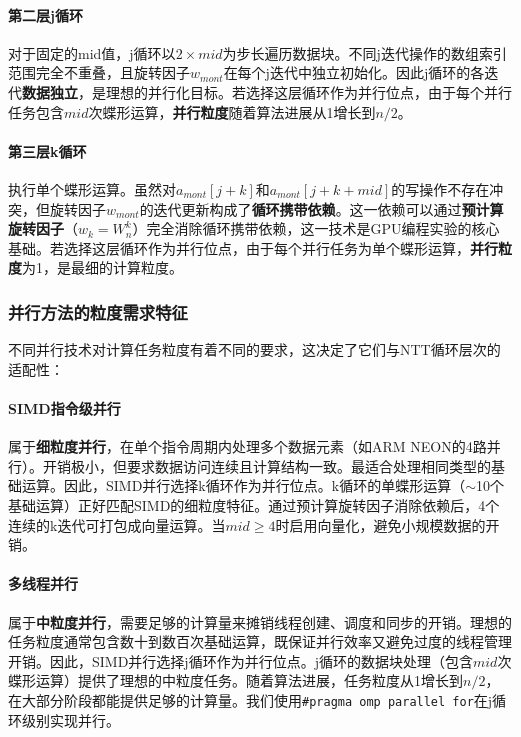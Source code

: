 \documentclass[a4paper]{article}
\begin{document}
\paragraph{第二层j循环} 对于固定的mid值，j循环以$2 \times mid$为步长遍历数据块。不同j迭代操作的数组索引范围完全不重叠，且旋转因子$w_{mont}$在每个j迭代中独立初始化。因此j循环的各迭代\textbf{数据独立}，是理想的并行化目标。若选择这层循环作为并行位点，由于每个并行任务包含$mid$次蝶形运算，\textbf{并行粒度}随着算法进展从1增长到$n/2$。

\paragraph{第三层k循环} 执行单个蝶形运算。虽然对$a_{mont}[j+k]$和$a_{mont}[j+k+mid]$的写操作不存在冲突，但旋转因子$w_{mont}$的迭代更新构成了\textbf{循环携带依赖}。这一依赖可以通过\textbf{预计算旋转因子}（$w_k = W_n^k$）完全消除循环携带依赖，这一技术是GPU编程实验的核心基础。若选择这层循环作为并行位点，由于每个并行任务为单个蝶形运算，\textbf{并行粒度}为1，是最细的计算粒度。

\subsubsection{并行方法的粒度需求特征}

不同并行技术对计算任务粒度有着不同的要求，这决定了它们与NTT循环层次的适配性：

\paragraph{SIMD指令级并行} 
属于\textbf{细粒度并行}，在单个指令周期内处理多个数据元素（如ARM NEON的4路并行）。开销极小，但要求数据访问连续且计算结构一致。最适合处理相同类型的基础运算。因此，SIMD并行选择k循环作为并行位点。k循环的单蝶形运算（$\sim$10个基础运算）正好匹配SIMD的细粒度特征。通过预计算旋转因子消除依赖后，4个连续的k迭代可打包成向量运算。当$mid \geq 4$时启用向量化，避免小规模数据的开销。

\paragraph{多线程并行} 
属于\textbf{中粒度并行}，需要足够的计算量来摊销线程创建、调度和同步的开销。理想的任务粒度通常包含数十到数百次基础运算，既保证并行效率又避免过度的线程管理开销。因此，SIMD并行选择j循环作为并行位点。j循环的数据块处理（包含$mid$次蝶形运算）提供了理想的中粒度任务。随着算法进展，任务粒度从1增长到$n/2$，在大部分阶段都能提供足够的计算量。我们使用\texttt{\#pragma omp parallel for}在j循环级别实现并行。
\end{document}
